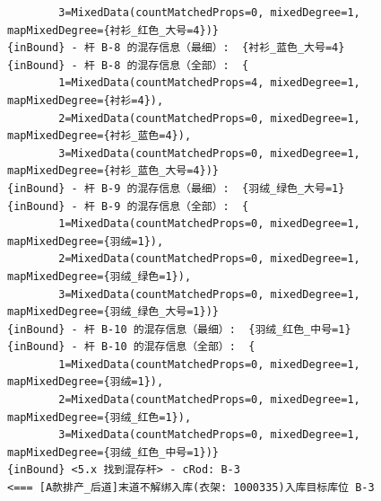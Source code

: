 {\begin{verbatim}
		3=MixedData(countMatchedProps=0, mixedDegree=1, mapMixedDegree={衬衫_红色_大号=4})}
{inBound} - 杆 B-8 的混存信息（最细）:  {衬衫_蓝色_大号=4}
{inBound} - 杆 B-8 的混存信息（全部）:  {
		1=MixedData(countMatchedProps=4, mixedDegree=1, mapMixedDegree={衬衫=4}), 
		2=MixedData(countMatchedProps=0, mixedDegree=1, mapMixedDegree={衬衫_蓝色=4}), 
		3=MixedData(countMatchedProps=0, mixedDegree=1, mapMixedDegree={衬衫_蓝色_大号=4})}
{inBound} - 杆 B-9 的混存信息（最细）:  {羽绒_绿色_大号=1}
{inBound} - 杆 B-9 的混存信息（全部）:  {
		1=MixedData(countMatchedProps=0, mixedDegree=1, mapMixedDegree={羽绒=1}), 
		2=MixedData(countMatchedProps=0, mixedDegree=1, mapMixedDegree={羽绒_绿色=1}), 
		3=MixedData(countMatchedProps=0, mixedDegree=1, mapMixedDegree={羽绒_绿色_大号=1})}
{inBound} - 杆 B-10 的混存信息（最细）:  {羽绒_红色_中号=1}
{inBound} - 杆 B-10 的混存信息（全部）:  {
		1=MixedData(countMatchedProps=0, mixedDegree=1, mapMixedDegree={羽绒=1}), 
		2=MixedData(countMatchedProps=0, mixedDegree=1, mapMixedDegree={羽绒_红色=1}), 
		3=MixedData(countMatchedProps=0, mixedDegree=1, mapMixedDegree={羽绒_红色_中号=1})}
{inBound} <5.x 找到混存杆> - cRod: B-3
<=== [A款排产_后道]末道不解绑入库(衣架: 1000335)入库目标库位 B-3


\end{verbatim}}
